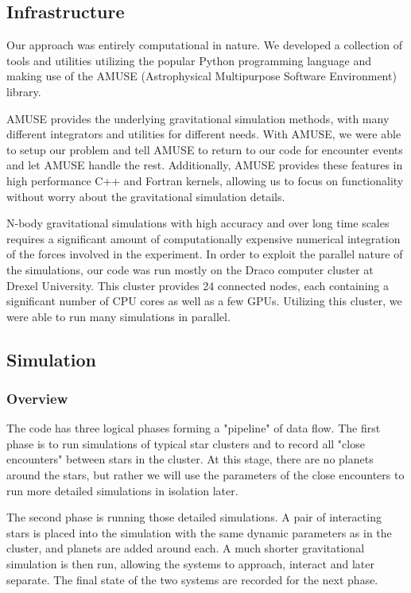 \documentclass[12pt]{article}
\begin{document}
    \subsection{Infrastructure}

    Our approach was entirely computational in nature. We developed a collection of tools
    and utilities utilizing the popular Python programming language and making use
    of the AMUSE (Astrophysical Multipurpose Software Environment) library. 

    AMUSE provides the underlying gravitational simulation methods, with many different
    integrators and utilities for different needs. With AMUSE, we were able to 
    setup our problem and tell AMUSE to return to our code for encounter events and
    let AMUSE handle the rest. Additionally, AMUSE provides these features in high
    performance C++ and Fortran kernels, allowing us to focus on functionality without
    worry about the gravitational simulation details.

    N-body gravitational simulations with high accuracy and over long time scales requires
    a significant amount of computationally expensive numerical integration of the 
    forces involved in the experiment. In order to exploit the parallel nature of 
    the simulations, our code was run mostly on the Draco computer 
    cluster at Drexel University. This cluster provides 24 connected nodes, each containing
    a significant number of CPU cores as well as a few GPUs. Utilizing this cluster,
    we were able to run many simulations in parallel.

    \subsection{Simulation}

    \subsubsection{Overview}

    The code has three logical phases forming a "pipeline" of data flow. 
    The first phase is to run simulations of typical
    star clusters and to record all "close encounters" between stars in the cluster.
    At this stage, there are no planets around the stars, but rather we will use the
    parameters of the close encounters to run more detailed simulations in isolation
    later.

    The second phase is running those detailed simulations. A pair of interacting stars
    is placed into the simulation with the same dynamic parameters as in the cluster,
    and planets are added around each. A much shorter gravitational simulation is then
    run, allowing the systems to approach, interact and later separate. The final
    state of the two systems are recorded for the next phase.
\end{document}
